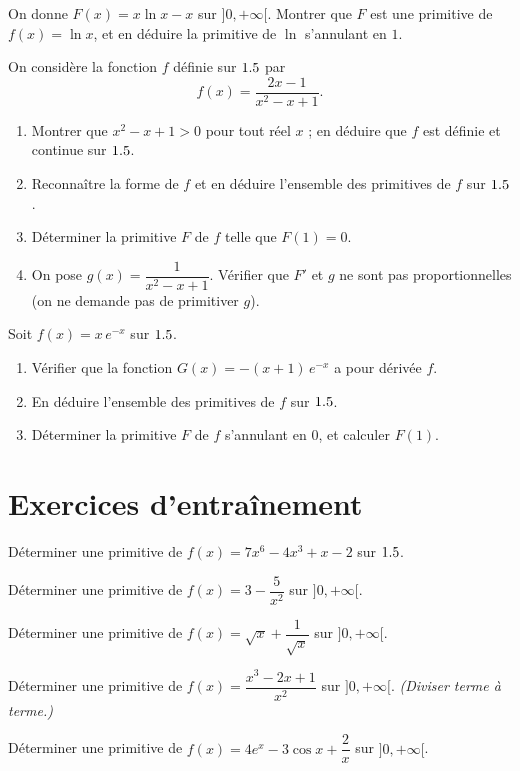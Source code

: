 \exo{} On donne $F(x)=x\ln x-x$ sur $]0,+\infty[$. Montrer que $F$ est une primitive de
$f(x)=\ln x$, et en déduire la primitive de $\ln$ s'annulant en $1$.


\exo{} On considère la fonction $f$ définie sur $1.5$ par
\[
f(x)=\frac{2x-1}{x^{2}-x+1}.
\]
\begin{enumerate}[label=\arabic*)]
\item Montrer que $x^{2}-x+1>0$ pour tout réel $x$ ; en déduire que $f$ est définie et continue sur $1.5$.
\item Reconnaître la forme de $f$ et en déduire l'ensemble des primitives de $f$ sur $1.5$.
\item Déterminer la primitive $F$ de $f$ telle que $F(1)=0$.
\item On pose $g(x)=\dfrac{1}{x^{2}-x+1}$. Vérifier que $F'$ et $g$ ne sont pas proportionnelles
(on ne demande pas de primitiver $g$).
\end{enumerate}

\exo{} Soit $f(x)=x\,e^{-x}$ sur $1.5$.
\begin{enumerate}[label=\arabic*)]
\item Vérifier que la fonction $G(x)=-(x+1)\,e^{-x}$ a pour dérivée $f$.
\item En déduire l'ensemble des primitives de $f$ sur $1.5$.
\item Déterminer la primitive $F$ de $f$ s'annulant en $0$, et calculer $F(1)$.
\end{enumerate}

\section{Exercices d'entraînement}

\exo{} Déterminer une primitive de $f(x)=7x^{6}-4x^{3}+x-2$ sur $1.5$.

\exo{} Déterminer une primitive de $f(x)=3-\dfrac5{x^{2}}$ sur $]0,+\infty[$.

\exo{} Déterminer une primitive de $f(x)=\sqrt x+\dfrac1{\sqrt x}$ sur $]0,+\infty[$.

\exo{} Déterminer une primitive de $f(x)=\dfrac{x^{3}-2x+1}{x^{2}}$ sur $]0,+\infty[$.
\emph{(Diviser terme à terme.)}

\exo{} Déterminer une primitive de $f(x)=4e^{x}-3\cos x+\dfrac2x$ sur $]0,+\infty[$.

